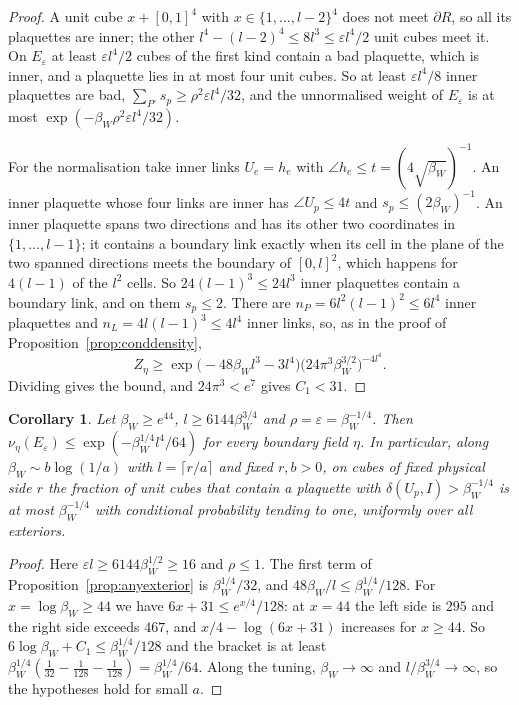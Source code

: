 \documentclass[11pt]{amsart}
\newtheorem{corollary}[theorem]{Corollary}
\theoremstyle{definition}
\theoremstyle{remark}
\numberwithin{equation}{section}
\begin{document}
\begin{proof}
A unit cube $x+[0,1]^4$ with $x\in\{1,\dots,l-2\}^4$ does not meet
$\partial R$, so all its plaquettes are inner; the other $l^4-(l-2)^4\le8l^3
\le\varepsilon l^4/2$ unit cubes meet it. On $E_\varepsilon$ at least
$\varepsilon l^4/2$ cubes of the first kind contain a bad plaquette, which is
inner, and a plaquette lies in at most four unit cubes. So at least
$\varepsilon l^4/8$ inner plaquettes are bad, $\sum_{P^\circ}s_p\ge\rho^2
\varepsilon l^4/32$, and the unnormalised weight of $E_\varepsilon$ is at
most $\exp(-\beta_W\rho^2\varepsilon l^4/32)$.

For the normalisation take inner links $U_e=h_e$ with $\angle h_e\le t=(4
\sqrt{\beta_W})^{-1}$. An inner plaquette whose four links are inner has
$\angle U_p\le4t$ and $s_p\le(2\beta_W)^{-1}$. An inner plaquette spans two
directions and has its other two coordinates in $\{1,\dots,l-1\}$; it
contains a boundary link exactly when its cell in the plane of the two
spanned directions meets the boundary of $[0,l]^2$, which happens for
$4(l-1)$ of the $l^2$ cells. So $24(l-1)^3\le24l^3$ inner plaquettes contain
a boundary link, and on them $s_p\le2$. There are $n_P=6l^2(l-1)^2\le6l^4$
inner plaquettes and $n_L=4l(l-1)^3\le4l^4$ inner links, so, as in the proof
of Proposition~\ref{prop:conddensity},
\[
Z_\eta\ge\exp\bigl(-48\beta_Wl^3-3l^4\bigr)\bigl(24\pi^3\beta_W^{3/2}
\bigr)^{-4l^4}.
\]
Dividing gives the bound, and $24\pi^3<e^7$ gives $C_1<31$.
\end{proof}

\begin{corollary}\label{cor:anyexterior}
Let $\beta_W\ge e^{44}$, $l\ge6144\beta_W^{3/4}$ and $\rho=\varepsilon=
\beta_W^{-1/4}$. Then $\nu_\eta(E_\varepsilon)\le\exp(-\beta_W^{1/4}l^4/64)$
for every boundary field $\eta$. In particular, along $\beta_W\sim b\log
(1/a)$ with $l=\lceil r/a\rceil$ and fixed $r,b>0$, on cubes of fixed
physical side $r$ the fraction of unit cubes that contain a plaquette with
$\delta(U_p,I)>\beta_W^{-1/4}$ is at most $\beta_W^{-1/4}$ with conditional
probability tending to one, uniformly over all exteriors.
\end{corollary}

\begin{proof}
Here $\varepsilon l\ge6144\beta_W^{1/2}\ge16$ and $\rho\le1$. The first term
of Proposition~\ref{prop:anyexterior} is $\beta_W^{1/4}/32$, and $48\beta_W
/l\le\beta_W^{1/4}/128$. For $x=\log\beta_W\ge44$ we have $6x+31\le e^{x/4}
/128$: at $x=44$ the left side is $295$ and the right side exceeds $467$, and
$x/4-\log(6x+31)$ increases for $x\ge44$. So $6\log\beta_W+C_1\le\beta_W
^{1/4}/128$ and the bracket is at least $\beta_W^{1/4}(\frac1{32}-\frac1{128}
-\frac1{128})=\beta_W^{1/4}/64$. Along the tuning, $\beta_W\to\infty$ and
$l/\beta_W^{3/4}\to\infty$, so the hypotheses hold for small $a$.
\end{proof}
\end{document}
